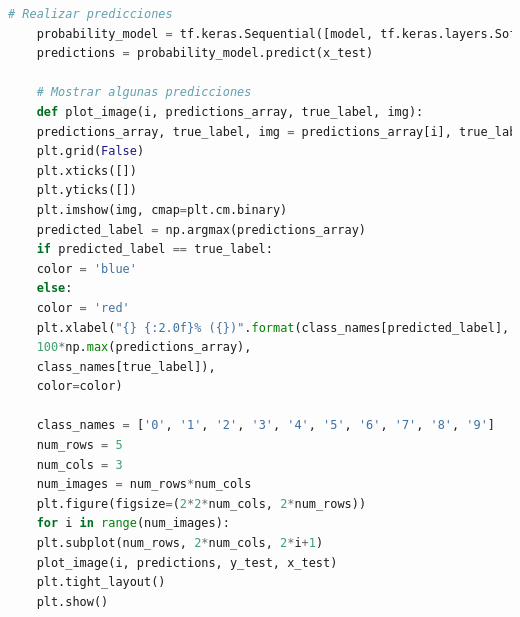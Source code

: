\documentclass[conference]{IEEEtran}
\begin{document}
\begin{lstlisting}[language=Python, caption=Código para el entrenamiento y clasificación del conjunto de datos MNIST de una red neuronal artificial con el modelo de memristor de HP incorporado.]
	# Realizar predicciones
	probability_model = tf.keras.Sequential([model, tf.keras.layers.Softmax()])
	predictions = probability_model.predict(x_test)
	
	# Mostrar algunas predicciones
	def plot_image(i, predictions_array, true_label, img):
	predictions_array, true_label, img = predictions_array[i], true_label[i], img[i]
	plt.grid(False)
	plt.xticks([])
	plt.yticks([])
	plt.imshow(img, cmap=plt.cm.binary)
	predicted_label = np.argmax(predictions_array)
	if predicted_label == true_label:
	color = 'blue'
	else:
	color = 'red'
	plt.xlabel("{} {:2.0f}% ({})".format(class_names[predicted_label],
	100*np.max(predictions_array),
	class_names[true_label]),
	color=color)
	
	class_names = ['0', '1', '2', '3', '4', '5', '6', '7', '8', '9']
	num_rows = 5
	num_cols = 3
	num_images = num_rows*num_cols
	plt.figure(figsize=(2*2*num_cols, 2*num_rows))
	for i in range(num_images):
	plt.subplot(num_rows, 2*num_cols, 2*i+1)
	plot_image(i, predictions, y_test, x_test)
	plt.tight_layout()
	plt.show()
\end{lstlisting}
\end{document}

